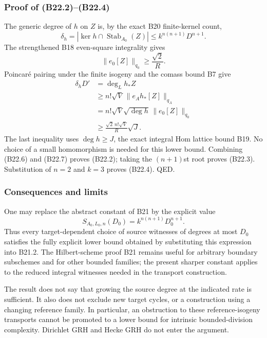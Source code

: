 \subsubsection{Proof of (B22.2)--(B22.4)}\label{proof-of-b22.2b22.4}

The generic degree of \(h\) on \(Z\) is, by the exact B20 finite-kernel count, \[
 \delta_h=|\ker h\cap\operatorname{Stab}_{A_0}(Z)|
 \le k^{n(n+1)}D^{n+1}.
\tag{B22.6}
\] The strengthened B18 even-square integrality gives \[
 \|e_0[Z]\|_{q_0}\ge\frac{\sqrt2}{R}.
\] Poincaré pairing under the finite isogeny and the comass bound B7 give \[
 \begin{aligned}
 \delta_hD'
 &=\deg_Lh_*Z\\
 &\ge n!\sqrt V\,\|e_Ah_*[Z]\|_{q_A}\\
 &=n!\sqrt V\sqrt{\deg h}\,\|e_0[Z]\|_{q_0}\\
 &\ge\frac{\sqrt2\,n!\sqrt V}{R}\sqrt J.
 \end{aligned}
\tag{B22.7}
\] The last inequality uses \(\deg h\ge J\), the exact integral Hom lattice bound B19. No choice of a small homomorphism is needed for this lower bound. Combining (B22.6) and (B22.7) proves (B22.2); taking the \((n+1)\)st root proves (B22.3). Substitution of \(n=2\) and \(k=3\) proves (B22.4). QED.

\subsubsection{Consequences and limits}\label{consequences-and-limits}

One may replace the abstract constant of B21 by the explicit value \[
 S_{A_0,L_0,n}(D_0)=k^{n(n+1)}D_0^{n+1}.
\] Thus every target-dependent choice of source witnesses of degrees at most \(D_0\) satisfies the fully explicit lower bound obtained by substituting this expression into B21.2. The Hilbert-scheme proof B21 remains useful for arbitrary boundary subschemes and for other bounded families; the present sharper constant applies to the reduced integral witnesses needed in the transport construction.

The result does not say that growing the source degree at the indicated rate is sufficient. It also does not exclude new target cycles, or a construction using a changing reference family. In particular, an obstruction to these reference-isogeny transports cannot be promoted to a lower bound for intrinsic bounded-division complexity. Dirichlet GRH and Hecke GRH do not enter the argument.

